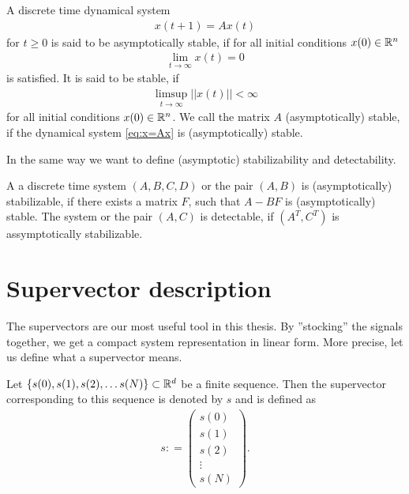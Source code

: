 \begin{defi}
	A discrete time dynamical system
	\begin{align}
	\label{eq:x=Ax}
	x(t+1) = A x(t)
	\end{align}
	for $t \geq 0$ 
	is said to be asymptotically stable, if for all initial conditions $x(0) \in {\mathbb{R}}^n$
	\begin{align}
	\lim_{t \to \infty} x(t) = 0
	\end{align}	
    is satisfied. 
	It is said to be stable, if 
	\begin{align}
	\limsup_{t \to \infty} ||x(t)|| < \infty
	\end{align}
	for all	 initial conditions $x(0) \in {\mathbb{R}}^n$.
	We call the matrix $A$ (asymptotically) stable, if the dynamical system \eqref{eq:x=Ax} is (asymptotically) stable.
\end{defi}


In the same way we want to define (asymptotic) stabilizability and detectability. 
\begin{defi}
A a discrete time system $(A, B, C, D)$ or the pair $(A, B)$ is (asymptotically) stabilizable, if there exists a matrix $F$, such that $A - BF$ is (asymptotically) stable.
The system or the pair $(A,C)$ is detectable, if $(A^T, C^T)$ is assymptotically stabilizable. 
\end{defi}

\section{Supervector description} 

The supervectors are our most useful tool in this thesis. By ''stocking'' the signals together, we get a compact system representation in linear form. More precise, let us define what a supervector means.  


\begin{defi}
	Let $\{s(0), s(1), s(2), \dots s(N)\} \subset {\mathbb{R}}^{d}$ be a finite sequence. Then the supervector corresponding to this sequence is denoted by $s$ and is defined as 
	\begin{align}
	s: = \begin{pmatrix}
	s(0) \\ s(1) \\ s(2) \\ \vdots \\ s(N)
	\end{pmatrix}.
	\end{align}
\end{defi}

